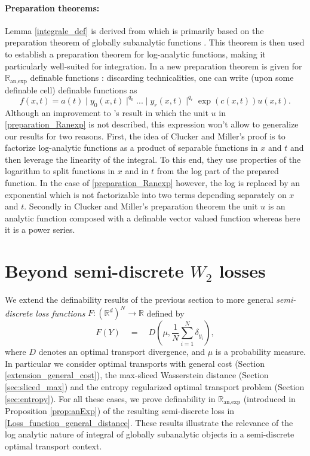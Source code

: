 \documentclass[11pt]{article}
\newcommand{\R}{\mathbb R}
\newcommand{\1}{\mathbbm{1}}
\numberwithin{equation}{section}
\begin{document}
\paragraph{Preparation theorems:}
Lemma \ref{integrale_def} is derived from \cite[Theorem 1.3]{Cluckers2009StabilityUI} which is primarily based on the preparation theorem of globally subanalytic functions \cite{parusinski2001preparation,miller2006preparation}. This theorem is then used to establish a preparation theorem for log-analytic functions, making it particularly well-suited for integration. In \cite{opris2021preparation} a new preparation theorem is given for $\mathbb{R}_{\text{an,exp}}$ definable functions : discarding technicalities, one can write (upon some definable cell) definable functions as
\begin{equation}\label{preparation_Ranexp}
    f(x,t)=a(t)\mid y_0(x,t)\mid^{q_0}...\mid y_r(x,t)\mid^{q_r}  \exp(c(x,t))u(x,t).
\end{equation}
Although an improvement to \cite{van2002minimal}'s result in which the unit $u$ in \eqref{preparation_Ranexp} is not described, this expression won't allow to generalize our results for two reasons. First, the idea of Clucker
and Miller’s proof is to factorize log-analytic functions as a product of separable functions in $x$ and $t$ and then leverage the linearity of the integral. To this end, they use properties of the logarithm to split functions in $x$ and in $t$ from the log part of the prepared function. In the case of \eqref{preparation_Ranexp} however, the log is replaced by an exponential
which is not factorizable into two terms depending separately on $x$ and $t$. Secondly in Clucker and Miller's preparation theorem the unit $u$ is an analytic function composed with a definable vector valued function whereas here it is a power series.








\section{Beyond semi-discrete $W_2$ losses}
\label{definability losses}


We extend the definability results of the previous section to more general \emph{semi-discrete loss functions} $F:(\R^d)^N\to \R$ defined by
\begin{equation}\label{Loss_function_general_distance}
    F(Y) \quad = \quad D\left(\mu,\frac{1}{N}\sum_{i=1}^{N}\delta_{y_{i}}\right),
\end{equation}
where $D$ denotes an optimal transport divergence, and $\mu$ is a probability measure. In particular we consider optimal transports with general cost (Section \ref{extension_general_cost}), the max-sliced Wasserstein distance (Section \ref{sec:sliced_max}) and the entropy regularized optimal transport problem (Section \ref{sec:entropy}). For all these cases, we prove definability in $\R_{\text{an,exp}}$ (introduced in Proposition \ref{prop:anExp}) of the resulting semi-discrete loss in \eqref{Loss_function_general_distance}. These results illustrate the relevance of the log analytic nature of integral of globally subanalytic objects in a semi-discrete optimal transport context.
\end{document}

